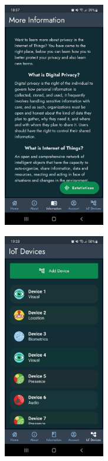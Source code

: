 \begin{figure}[H]
\begin{subfigure}{0.30\textwidth}
        \includegraphics[width=125pt]{../assets/images/live_more_info.jpg}
        \caption{}
        \label{fig:livefaq}
    \end{subfigure}
    \begin{subfigure}{0.30\textwidth}
        \centering
        \includegraphics[width=125pt]{../assets/images/live_devices.jpg}
        \caption{}
        \label{fig:live_devices}
    \end{subfigure}
    \begin{subfigure}{0.30\textwidth}
        \centering

\end{subfigure}
\end{figure}
